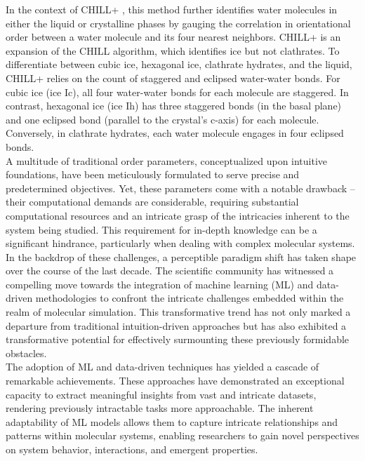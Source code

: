 In the context of CHILL+ \cite{Nguyen2014}, this method further identifies water molecules in either the liquid or crystalline phases by gauging the correlation in orientational order between a water molecule and its four nearest neighbors. CHILL+ is an expansion of the CHILL algorithm, which identifies ice but not clathrates. To differentiate between cubic ice, hexagonal ice, clathrate hydrates, and the liquid, CHILL+ relies on the count of staggered and eclipsed water-water bonds. For cubic ice (ice Ic), all four water-water bonds for each molecule are staggered. In contrast, hexagonal ice (ice Ih) has three staggered bonds (in the basal plane) and one eclipsed bond (parallel to the crystal's c-axis) for each molecule. Conversely, in clathrate hydrates, each water molecule engages in four eclipsed bonds.\\

A multitude of traditional order parameters, conceptualized upon intuitive foundations, have been meticulously formulated to serve precise and predetermined objectives. Yet, these parameters come with a notable drawback – their computational demands are considerable, requiring substantial computational resources and an intricate grasp of the intricacies inherent to the system being studied. This requirement for in-depth knowledge can be a significant hindrance, particularly when dealing with complex molecular systems.\\
In the backdrop of these challenges, a perceptible paradigm shift has taken shape over the course of the last decade. The scientific community has witnessed a compelling move towards the integration of machine learning (ML) and data-driven methodologies to confront the intricate challenges embedded within the realm of molecular simulation. This transformative trend has not only marked a departure from traditional intuition-driven approaches but has also exhibited a transformative potential for effectively surmounting these previously formidable obstacles.\\
The adoption of ML and data-driven techniques has yielded a cascade of remarkable achievements. These approaches have demonstrated an exceptional capacity to extract meaningful insights from vast and intricate datasets, rendering previously intractable tasks more approachable. The inherent adaptability of ML models allows them to capture intricate relationships and patterns within molecular systems, enabling researchers to gain novel perspectives on system behavior, interactions, and emergent properties.\\

